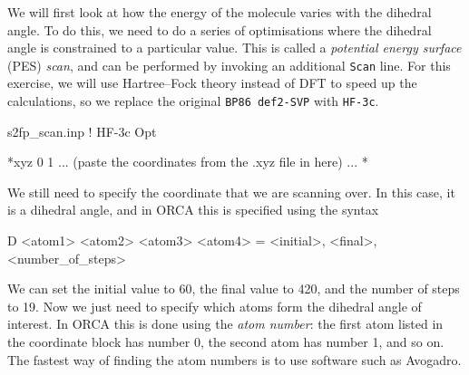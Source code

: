 \documentclass[10pt]{article}
\begin{document}
We will first look at how the energy of the molecule varies with the  dihedral angle. To do this, we need to do a series of optimisations where the dihedral angle is constrained to a particular value. This is called a \textit{potential energy surface} (PES) \textit{scan}, and can be performed by invoking an additional \texttt{Scan} line. For this exercise, we will use Hartree--Fock theory instead of DFT to speed up the calculations, so we replace the original \texttt{BP86 def2-SVP} with \texttt{HF-3c}.

\begin{script}{s2fp\_scan.inp}
! HF-3c Opt



*xyz 0 1
 ... (paste the coordinates from the .xyz file in here) ...
*
\end{script}

We still need to specify the coordinate that we are scanning over. In this case, it is a dihedral angle, and in ORCA this is specified using the syntax

\begin{cmdline}
D <atom1> <atom2> <atom3> <atom4> = <initial>, <final>, <number_of_steps>
\end{cmdline}

We can set the initial value to 60, the final value to 420, and the number of steps to 19. Now we just need to specify which atoms form the dihedral angle of interest. In ORCA this is done using the \textit{atom number}: the first atom listed in the coordinate block has number 0, the second atom has number 1, and so on. The fastest way of finding the atom numbers is to use software such as Avogadro.
\end{document}
